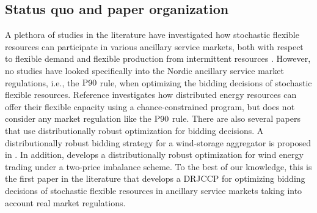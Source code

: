 \documentclass[conference]{IEEEtran}
\begin{document}
\subsection{Status quo and paper organization}
\vspace{-1mm}
A plethora of studies in the literature have investigated how stochastic flexible resources can participate in various ancillary service markets, both with respect to flexible demand  \cite{bondy2016procedure, bondy2014performance, biegel2014integration, AchievingControllabilityofElectricLoads} and flexible production from intermittent resources \cite{hansen2016provision, ullah2009wind, morey2023comprehensive, alshehri2019modelling}. However, no studies have looked specifically into the Nordic ancillary service market regulations, i.e., the $\rm{P90}$ rule, when optimizing the bidding decisions of stochastic flexible resources. Reference \cite{zhang2018data} investigates how distributed energy resources can offer their flexible capacity using a chance-constrained program, but does not consider any market regulation like the $\rm{P90}$ rule. There are also several papers that use distributionally robust optimization for bidding decisions. A distributionally robust bidding strategy for a wind-storage aggregator is proposed in \cite{Hug}. In addition, \cite{pierre} develops a distributionally robust optimization for wind energy trading under a two-price imbalance scheme. To the best of our knowledge, this is the first paper in the literature that develops a \ac{DRJCCP} for optimizing bidding decisions of stochastic flexible resources in ancillary service markets taking into account real market regulations. 



\end{document}

